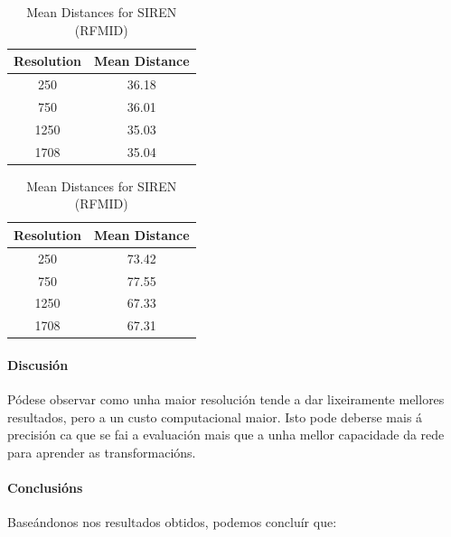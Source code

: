 \begin{table}[h]
    \centering
    \begin{minipage}[t]{0.45\linewidth}
        \centering
        \begin{tabular}{|c|c|}
        \hline
        Resolution & Mean Distance \\ \hline
        250 & 36.18 \\ \hline
        750 & 36.01 \\ \hline
        1250 & 35.03 \\ \hline
        1708 & 35.04 \\ \hline
        \end{tabular}
        \caption{Mean Distances for MLP (RFMID)}
        \label{tab:mlp_mean_distances_rfmid}
    \end{minipage}
    \hfill
    \begin{minipage}[t]{0.45\linewidth}
        \centering
        \begin{tabular}{|c|c|}
        \hline
        Resolution & Mean Distance \\ \hline
        250 & 73.42 \\ \hline
        750 & 77.55 \\ \hline
        1250 & 67.33 \\ \hline
        1708 & 67.31 \\ \hline
        \end{tabular}
        \caption{Mean Distances for SIREN (RFMID)}
        \label{tab:siren_mean_distances_rfmid}
    \end{minipage}
\end{table}

\paragraph{Discusión}
\label{par:Discusión}

Pódese observar como unha maior resolución tende a dar lixeiramente mellores resultados, pero a un custo computacional maior.
Isto pode deberse mais á precisión ca que se fai a evaluación mais que a unha mellor capacidade da rede para aprender as transformacións.


\paragraph{Conclusións}
\label{par:Conclusións}

Baseándonos nos resultados obtidos, podemos concluír que:

